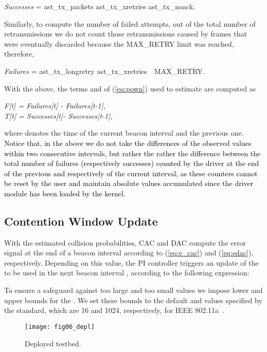 \documentclass[a4paper,10pt]{article}
\newcommand{\revs}[1]{\textcolor{black}{#1}}
\begin{document}
\begin{center}
 \emph{Successes} = {\ttfamily ast\_tx\_packets  ast\_tx\_xretries  ast\_tx\_noack.}
\end{center}
Similarly, to compute the number of failed attempts, out of the total number of retransmissions we do not count those retransmissions caused by frames that were eventually discarded because the {\ttfamily MAX\_RETRY} limit was reached, therefore, 
\begin{center}
 \emph{Failures} = {\ttfamily ast\_tx\_longretry  ast\_tx\_xretries~~MAX\_RETRY.}
\end{center}
With the above, the terms  and  of (\ref{eq:pown}) used to estimate  are computed as
\begin{center}
\emph{
F[t] = Failures[t] - Failures[t-1], \\
T[t] = Successes[t]- Successes[t-1],}
\end{center}
where  denotes the time of the current beacon interval and  the previous one. \revs{Notice that, in the above we do not take the differences of the observed values within two consecutive intervals, but rather the rather the difference between the total number of failures (respectively successes) counted by the driver at the end of the previous and respectively of the current interval, as these counters cannot be reset by the user and maintain absolute values accumulated since the driver module has been loaded by the kernel.}


\subsection{Contention Window Update}
\label{sec:cw_update}
With the estimated collision probabilities, CAC and DAC compute the error signal at the end of a beacon interval according to (\ref{eq:e_cac}) and (\ref{eq:edac}), respectively. Depending on this value, the PI controller triggers an update of the  to be used in the next beacon interval , according to the following expression:


To ensure a safeguard against too large and too small  values we impose lower and upper bounds for the . We set these bounds to the default  and  values specified by the standard, which are 16 and 1024, respectively, for IEEE 802.11a~\cite{80211A}.

\begin{figure}[!t]\texttt{[image: fig06\_depl]}\caption{Deployed testbed.}\label{fig:testbed}\end{figure}
\end{document}
